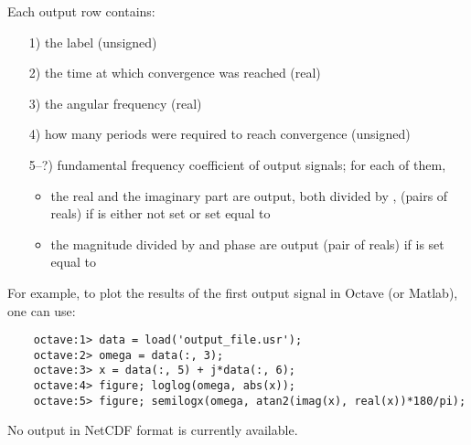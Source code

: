 Each output row contains:
\begin{itemize}
\item[1)] the label (unsigned)
\item[2)] the time at which convergence was reached (real)
\item[3)] the angular frequency (real)
\item[4)] how many periods were required to reach convergence (unsigned)
\item[5--?)] fundamental frequency coefficient of output signals; for each of them, 
\begin{itemize}
	\item the real and the imaginary part are output, both divided by , (pairs of reals) 
	if  is either not set or set equal to 
	\item the magnitude divided by  and phase are output (pair of reals)
	if  is set equal to 
\end{itemize}
\end{itemize}
For example, to plot the results of the first output signal in Octave (or Matlab), one can use:
\begin{framed}
\begin{verbatim}
    octave:1> data = load('output_file.usr');
    octave:2> omega = data(:, 3);
    octave:3> x = data(:, 5) + j*data(:, 6);
    octave:4> figure; loglog(omega, abs(x));
    octave:5> figure; semilogx(omega, atan2(imag(x), real(x))*180/pi);
\end{verbatim}
\end{framed}


No output in NetCDF format is currently available.

